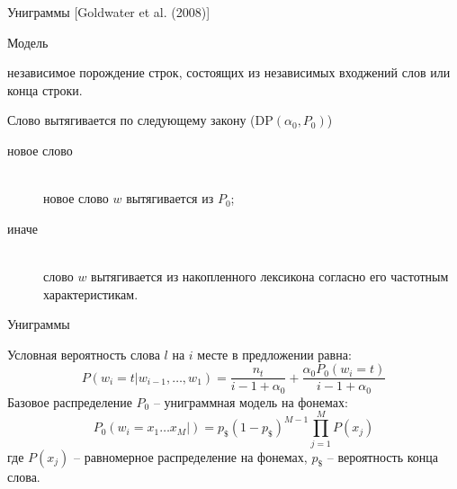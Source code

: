 \documentclass{beamer}
\newcommand{\brac}[1]{\left ( #1 \right )}
\newcommand{\induc}[1]{\left . #1 \right \vert}
\begin{document}
\begin{frame}{Униграммы [Goldwater et al. (2008)]}
  \begin{block}{Модель}

    независимое порождение строк, состоящих из независимых входжений слов или конца строки. 
  \end{block}

  \begin{block}

    Слово вытягивается по следующему закону ($\text{DP}\brac{\alpha_0,P_0}$)
    \begin{description}
      \item[новое слово]\hfill\\
        новое слово $w$ вытягивается из $P_0$;
        \item[иначе]\hfill\\
        слово $w$ вытягивается из накопленного лексикона согласно его частотным характеристикам.
    \end{description}    
  \end{block}
\end{frame}
\begin{frame}{Униграммы}
  \begin{block}

    Условная вероятность слова $l$ на $i$ месте в предложении равна:
    \[P\brac{\induc{w_i = t}w_{i-1},\ldots,w_1} = \frac{n_t}{i-1+\alpha_0} + \frac{\alpha_0 P_0(w_i = t)}{i-1+\alpha_0}\]
    Базовое распределение $P_0$ -- униграммная модель на фонемах:
    \[P_0\brac{\induc{w_i = x_1\ldots x_M}} = p_\$ \brac{1-p_\$}^{M-1} \prod_{j=1}^M P(x_j)\]
    где $P(x_j)$ -- равномерное распределение на фонемах, $p_\$$ -- вероятность конца слова.
  \end{block}
\end{frame}

\end{document}
